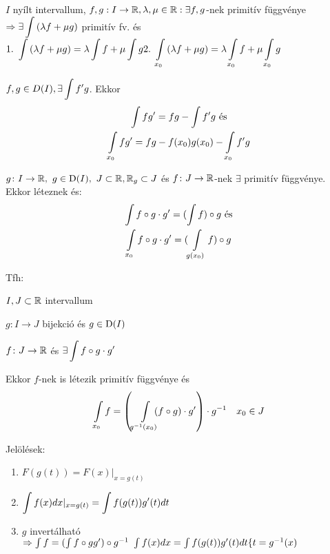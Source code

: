 \begin{te}
  $I$ nyílt intervallum, $f,g:I\to\mathbb{R}, \lambda,\mu\in\mathbb{R}:\exists f,g$-nek primitív függvénye$\nn\di \exists\Int{(\la f+\mu g)}$
  primitív fv. és \\
  $\di 1.~\Int{(\la f+\mu g)}=\la\Int{f}+\mu\Int{g}\\2.~\Int_{x_0}{(\la f+\mu g)}=\la\Int_{x_0}{f}+\mu\Int_{x_0}{g}$
\end{te}


\begin{te}
  $\di f,g\in D(I),\exists\Int{f'g}$. Ekkor\\
\begin{gather*}
  \Int fg'=fg-\Int f'g\text{ és}\\
  \Int_{x_0}{fg'}=fg-f(x_0)g(x_0)-\Int_{x_0}{f'g}
\end{gather*}
\end{te}

\begin{te}
$g\colon I\to\R,\ g\in\Der(I),\ J\subset\R,\R_g\subset J$ és $f\colon J\to\mathbb{R}$-nek $\exists$ primitív függvénye.
  Ekkor léteznek és:
\begin{gather*}
  \Int{f\circ{g}}\cdot g'=(\Int{f})\circ{g}\text{ és}\\
  \Int_{x_0}{f\circ{g}}\cdot g'=(\Int_{g(x_0)}{f})\circ{g}
\end{gather*}
\end{te}

\begin{te} Tfh:
\begin{enumzjr}
\item $I,J\subset\mathbb{R}$ intervallum
\item $g\colon I\to J$ bijekció és $g\in\operatorname{D}(I)$
\item $f\colon J\to \mathbb{R}$ és $\exists\displaystyle \int f\circ g\cdot g'$
\end{enumzjr}
Ekkor $f$-nek is létezik primitív függvénye és
\[ \Int_{x_0}f=\left(\Int_{g^{-1}(x_0)}\!\!\! (f\circ g)\cdot g'\right)\cdot g^ {-1}\quad x_0\in J\]
\end{te}

Jelölések:
\begin{enumerate}
  \item $F(g(t))=F(x)|_{x=g(t)}$
  \item $\di\Int{f(x)dx}|_{x=g(t)}=\Int{f(g(t))g'(t)dt}$
  \item $g$ invertálható $\nn\Int{f}=(\Int{f\circ{g}g'})\circ{g^{-1}}\ \Int{f(x)dx}=\Int{f(g(t))g'(t)dt\{t=g^{-1}(x)}$
\end{enumerate}


